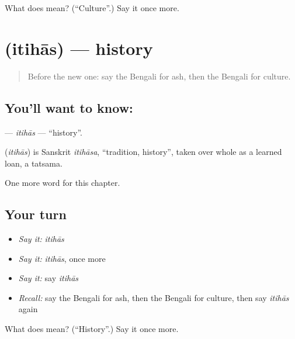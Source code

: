 \begin{tcolorbox}[breakable,colback=teal!4,colframe=teal!35!black,title={Before you move on}]
What does  mean? (\textquotedblleft{}Culture\textquotedblright{}.) Say it once more.
\end{tcolorbox}
\section[\texorpdfstring{\bn{ইতিহাস} (itihās)}{ইতিহাস (itihās)}]{ (itihās) — history}

\label{lesson:BN-C256-itihas}



\begin{quote}
Before the new one: say the Bengali for ash, then the Bengali for culture.
\end{quote}

\subsection*{You'll want to know: }
\textbf{} — \emph{itihās} — \textquotedblleft{}history\textquotedblright{}.

\begin{cousinweb}
\textbf{} (\emph{itihās}) is Sanskrit \emph{itihāsa}, \textquotedblleft{}tradition, history\textquotedblright{}, taken over whole as a learned loan, a tatsama.
\end{cousinweb}

\begin{grammarlens}[title={What you've built}]
One more word for this chapter.
\end{grammarlens}

\subsection*{Your turn}
\begin{itemize}
\raggedright
  \item \emph{Say it:} \emph{itihās}
  \item \emph{Say it:} \emph{itihās}, once more
  \item \emph{Say it:} say \emph{itihās}
  \item \emph{Recall:} say the Bengali for ash, then the Bengali for culture, then say \emph{itihās} again
\end{itemize}

\begin{tcolorbox}[breakable,colback=teal!4,colframe=teal!35!black,title={Before you move on}]
What does  mean? (\textquotedblleft{}History\textquotedblright{}.) Say it once more.
\end{tcolorbox}
